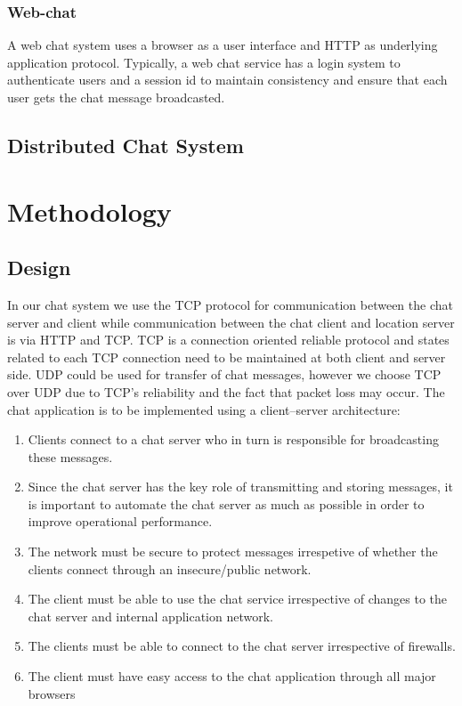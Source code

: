 \documentclass{article}
\begin{document}
\subsubsection{Web-chat}
A web chat system uses a browser as a user interface and HTTP as underlying application protocol. Typically, a web chat service has a login system to authenticate users and a session id to maintain consistency and ensure that each user gets the chat message broadcasted.
\subsection{Distributed Chat System}

\section{Methodology}
\subsection{Design}
In our chat system we use the TCP protocol for communication between the chat server and client while communication between the chat client and location server is via HTTP and TCP. TCP is a connection oriented reliable protocol and states related to each TCP connection need to be maintained at both client and server side. UDP could be used for transfer of chat messages, however we choose TCP over UDP due to TCP's reliability and the fact that packet loss may occur. 
The chat application is to be implemented using a client–server architecture:
\begin{enumerate}
\item Clients connect to a chat server who in turn is responsible for broadcasting these messages.
\item Since the chat server has the key role of transmitting and storing
messages, it is important to automate the chat server as much as possible in
order to improve operational performance.
\item The network must be secure to protect messages irrespetive of whether the
clients connect through an insecure/public network.
\item The client must be able to use the chat service irrespective of changes to
the chat server and internal application network.
\item The clients must be able to connect to the chat server irrespective of
firewalls.
\item The client must have easy access to the chat application through all major
browsers
\end{enumerate}
\end{document}

